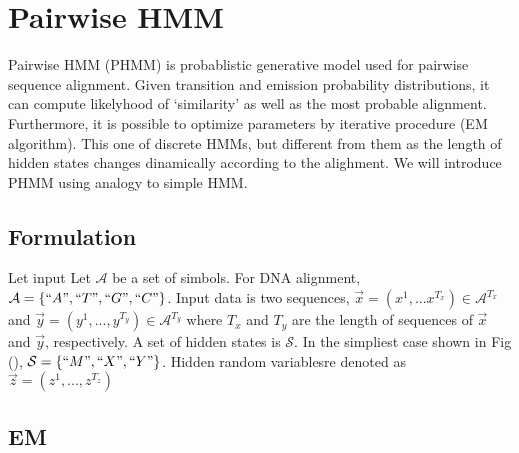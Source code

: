 \section{Pairwise HMM}
Pairwise HMM (PHMM) is probablistic generative model used for pairwise sequence alignment. Given transition and emission probability distributions, it can compute likelyhood of `similarity' as well as the most probable alignment. Furthermore, it is possible to optimize parameters by iterative procedure (EM algorithm). This one of discrete HMMs, but different from them as the length of hidden states changes dinamically according to the alighment. We will introduce PHMM using analogy to simple HMM.

\subsection{Formulation}
Let input 
 Let $\mathcal{A}$ be a set of simbols. For DNA alignment, $\mathcal{A} = \{``A", ``T", ``G", ``C"\}$. Input data is two sequences, $\vec{x} = (x^1, ... x^{T_x}) \in \mathcal{A}^{T_x}$ and $\vec{y} = (y^1, ..., y^{T_y}) \in \mathcal{A}^{T_y}$ where $T_x$ and $T_y$ are the length of sequences of $\vec{x}$ and $\vec{y}$, respectively. A set of hidden states is $\mathcal{S}$. In the simpliest case shown in Fig (), $\mathcal{S} = \{``M", ``X", ``Y"\}$. Hidden random variablesre denoted as $\vec{z} = (z^1, ..., z^{T_z})$


\subsection{EM}


